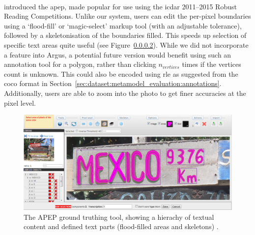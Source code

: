 \paragraph{} 

\citet{Karatzas:2014bt} introduced the  \gls{apep}, made popular for use using the \gls{icdar} 2011--2015 Robust Reading Competitions. Unlike our system, users can edit the per-pixel boundaries using a `flood-fill' or `magic-select' markup tool (with an adjustable tolerance), followed by a skeletonisation of the boundaries filled. This speeds up selection of specific text areas quite useful (see Figure~\ref{}). While we did not incorporate a feature into Argus, a potential future version would benefit using such an annotation tool for a polygon, rather than clicking $n_{vertices}$ times if the vertices count is unknown. This could also be encoded using \gls{rle} as suggested from the \gls{coco} format in Section~\ref{sec:dataset:metamodel_evaluation:annotations}. Additionally, users are able to zoom into the photo to get finer accuracies at the pixel level.


\begin{figure}[h]
  \includegraphics[width=\textwidth]{images/dataset/tools/apep}
  \caption[The APEP user interface]{The APEP ground truthing tool, showing a hierachy of textual content and defined text parts (flood-filled areas and skeletons) \cite{Karatzas:2014bt}.}
  \label{}
\end{figure}


\paragraph{}

